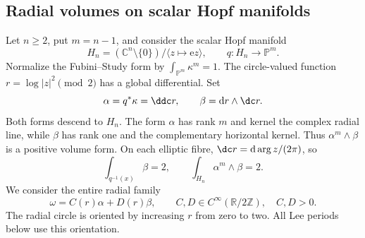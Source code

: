 \subsection{Radial volumes on scalar Hopf manifolds}
\label{subsec:radial-gauduchon-lck-volumes}

Let $n\geq2$, put $m=n-1$, and consider the scalar Hopf manifold
\[
 H_n=(\mathbb C^n\setminus\{0\})/\langle z\mapsto\mathrm e z\rangle,
 \qquad q:H_n\longrightarrow\mathbb P^m.
\]
Normalize the Fubini--Study form by $\int_{\mathbb P^m}\kappa^m=1$. The circle-valued function $r=\log|z|^2\pmod2$ has a global differential. Set
\[
 \alpha=q^*\kappa=\ddc r,\qquad
 \beta=\mathrm dr\wedge\dc r.
\]
Both forms descend to $H_n$. The form $\alpha$ has rank $m$ and kernel the complex radial line, while $\beta$ has rank one and the complementary horizontal kernel. Thus $\alpha^m\wedge\beta$ is a positive volume form. On each elliptic fibre, $\dc r=\mathrm d\arg z/(2\pi)$, so
\[
 \int_{q^{-1}(x)}\beta=2,\qquad
 \int_{H_n}\alpha^m\wedge\beta=2.
\]
We consider the entire radial family
\begin{equation}\label{eq:radial-lck-family}
 \omega=C(r)\alpha+D(r)\beta,\qquad
 C,D\in C^\infty(\mathbb R/2\mathbb Z),\quad C,D>0.
\end{equation}
The radial circle is oriented by increasing $r$ from zero to two. All Lee periods below use this orientation.

